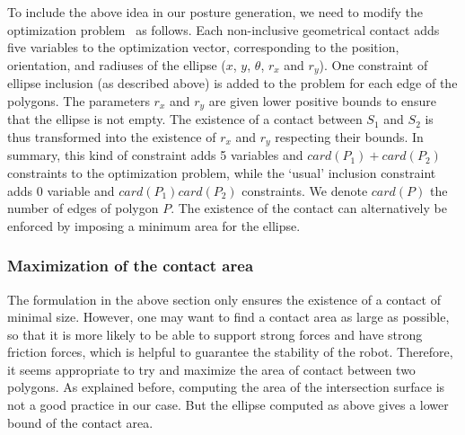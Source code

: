 To include the above idea in our posture generation, we need to modify the optimization problem~ as follows.
Each non-inclusive geometrical contact adds five variables to the optimization vector, corresponding to the position, orientation, and radiuses of the ellipse ($x$, $y$, $\theta$, $r_x$ and $r_y$).
One constraint of ellipse inclusion (as described above) is added to the problem for each edge of the polygons.
The parameters $r_x$ and $r_y$ are given lower positive bounds to ensure that the ellipse is not empty.
The existence of a contact between $S_1$ and $S_2$ is thus transformed into the existence of $r_x$ and $r_y$ respecting their bounds.
In summary, this kind of constraint adds 5 variables and $card(P_1)+card(P_2)$ constraints to the optimization problem, while the `usual' inclusion constraint adds 0 variable and $card(P_1)card(P_2)$ constraints.
We denote $card(P)$ the number of edges of polygon $P$.
The existence of the contact can alternatively be enforced by imposing a minimum area for the ellipse.



\subsubsection{Maximization of the contact area}
\label{subsubsec:optim-ellipse-area}


The formulation in the above section only ensures the existence of a contact of minimal size.
However, one may want to find a contact area as large as possible, so that it is more likely to be able to support strong forces and have strong friction forces, which is helpful to guarantee the stability of the robot.
Therefore, it seems appropriate to try and maximize the area of contact between two polygons.
As explained before, computing the area of the intersection surface is not a good practice in our case.
But the ellipse computed as above gives a lower bound of the contact area.

